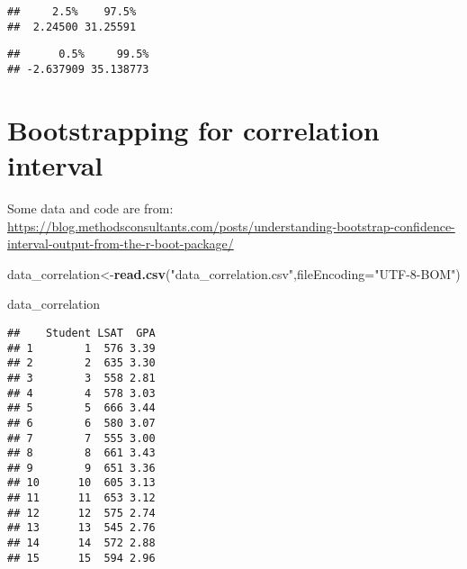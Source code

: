 \documentclass[]{book}
\newenvironment{Shaded}{\begin{snugshade}}{\end{snugshade}}
\newcommand{\CommentTok}[1]{\textcolor[rgb]{0.56,0.35,0.01}{\textit{#1}}}
\newcommand{\DataTypeTok}[1]{\textcolor[rgb]{0.13,0.29,0.53}{#1}}
\newcommand{\FloatTok}[1]{\textcolor[rgb]{0.00,0.00,0.81}{#1}}
\newcommand{\KeywordTok}[1]{\textcolor[rgb]{0.13,0.29,0.53}{\textbf{#1}}}
\newcommand{\NormalTok}[1]{#1}
\newcommand{\OperatorTok}[1]{\textcolor[rgb]{0.81,0.36,0.00}{\textbf{#1}}}
\newcommand{\StringTok}[1]{\textcolor[rgb]{0.31,0.60,0.02}{#1}}
\begin{document}
\begin{verbatim}
##     2.5%    97.5% 
##  2.24500 31.25591
\end{verbatim}

\begin{Shaded}
\end{Shaded}

\begin{verbatim}
##      0.5%     99.5% 
## -2.637909 35.138773
\end{verbatim}

\hypertarget{bootstrapping-for-correlation-interval}{%
\section{Bootstrapping for correlation interval}\label{bootstrapping-for-correlation-interval}}

Some data and code are from: \url{https://blog.methodsconsultants.com/posts/understanding-bootstrap-confidence-interval-output-from-the-r-boot-package/}

\begin{Shaded}
\begin{Highlighting}[]
\NormalTok{data_correlation<-}\KeywordTok{read.csv}\NormalTok{(}\StringTok{"data_correlation.csv"}\NormalTok{,}\DataTypeTok{fileEncoding=}\StringTok{"UTF-8-BOM"}\NormalTok{)}

\NormalTok{data_correlation}
\end{Highlighting}
\end{Shaded}

\begin{verbatim}
##    Student LSAT  GPA
## 1        1  576 3.39
## 2        2  635 3.30
## 3        3  558 2.81
## 4        4  578 3.03
## 5        5  666 3.44
## 6        6  580 3.07
## 7        7  555 3.00
## 8        8  661 3.43
## 9        9  651 3.36
## 10      10  605 3.13
## 11      11  653 3.12
## 12      12  575 2.74
## 13      13  545 2.76
## 14      14  572 2.88
## 15      15  594 2.96
\end{verbatim}

\begin{Shaded}
\end{Shaded}
\end{document}
